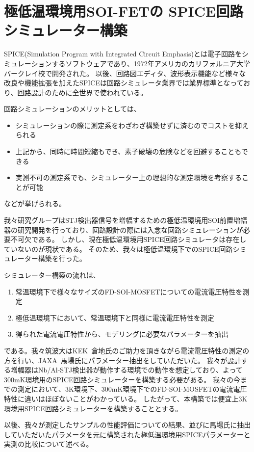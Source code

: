 \chapter{極低温環境用SOI-FETの \newline SPICE回路シミュレーター構築}
	SPICE(Simulation Program with Integrated Circuit Emphasis)とは電子回路をシミュレーションするソフトウェアであり、1972年アメリカのカリフォルニア大学バークレイ校で開発された。
	以後、回路図エディタ、波形表示機能など様々な改良や機能拡張を加えたSPICEは回路シミュレータ業界では業界標準となっており、回路設計のために全世界で使われている。
	
	回路シミュレーションのメリットとしては、
	\begin{itemize}
		\item シミュレーションの際に測定系をわざわざ構築せずに済むのでコストを抑えられる
		\item 上記から、同時に時間短縮もでき、素子破壊の危険などを回避することもできる
		\item 実測不可の測定系でも、シミュレーター上の理想的な測定環境を考察することが可能
	\end{itemize}
	などが挙げられる。
	
	我々研究グループはSTJ検出器信号を増幅するための極低温環境用SOI前置増幅器の研究開発を行っており、回路設計の際には入念な回路シミュレーションが必要不可欠である。
	しかし、現在極低温環境用SPICE回路シミュレータは存在していないのが現状である。
	そのため、我々は極低温環境下でのSPICE回路シミュレーター構築を行った。
	
	シミュレーター構築の流れは、
	\begin{enumerate}
		\item 常温環境下で様々なサイズのFD-SOI-MOSFETについての電流電圧特性を測定
		\item 極低温環境下において、常温環境下と同様に電流電圧特性を測定
		\item 得られた電流電圧特性から、モデリングに必要なパラメーターを抽出
	\end{enumerate}
	である。我々筑波大はKEK\ 倉地氏のご助力を頂きながら電流電圧特性の測定の方を行い、JAXA\ 馬場氏にパラメーター抽出をしていただいた。
	我々が設計する増幅器はNb/Al-STJ検出器が動作する環境での動作を想定しており、よって300mK環境用のSPICE回路シミュレーターを構築する必要がある。
	我々の今までの測定において、3K環境下、300mK環境下でのFD-SOI-MOSFETの電流電圧特性に違いはほぼないことがわかっている。
	したがって、本構築では便宜上3K環境用SPICE回路シミュレーターを構築することとする。
	
	以後、我々が測定したサンプルの性能評価についての結果、並びに馬場氏に抽出していただいたパラメータを元に構築された極低温環境用SPICEパラメーターと実測の比較について述べる。
	\clearpage
